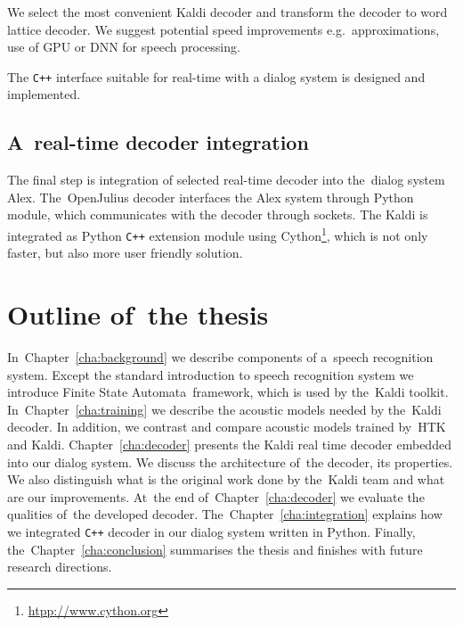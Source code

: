 We select the most convenient Kaldi decoder and 
transform the decoder to word lattice decoder. 
We suggest potential speed improvements e.g.\ approximations, use of \ac{GPU} 
or \ac{DNN} for speech processing\cite{vesely2013sequencediscriminative}.

The \verb!C++! interface suitable for real-time with a dialog system is designed and implemented.

\subsection{A~real-time decoder integration} 
\label{sub:integration}
The final step is integration of selected real-time decoder into the~dialog system Alex.
The~OpenJulius decoder interfaces the Alex system through Python module, 
which communicates with the decoder through sockets.
The Kaldi is integrated as Python \verb!C++! extension module 
using Cython\footnote{\url{htpp://www.cython.org}}, 
which is not only faster, but also more user friendly solution.


\section{Outline of~the thesis} 
\label{sec:outline_of_the_thesis}
In~Chapter~\ref{cha:background} we describe components of a~speech recognition system.  
Except the standard introduction to speech recognition system we introduce Finite State Automata~framework,
which is used by the~Kaldi toolkit. In~Chapter~\ref{cha:training} we describe the acoustic 
models needed by the~Kaldi decoder. 
In addition, we contrast and compare acoustic models trained by~\ac{HTK} and Kaldi. 
Chapter~\ref{cha:decoder} presents the Kaldi real time decoder embedded into our dialog system.
We discuss the architecture of~the decoder, its properties. We also distinguish what is the original work done by 
the~Kaldi team and what are our improvements. At~the end of~Chapter~\ref{cha:decoder} 
we evaluate the qualities of~the developed decoder.
The~Chapter~\ref{cha:integration} explains how we integrated \verb!C++! decoder in our dialog system written in Python.
Finally, the~Chapter~\ref{cha:conclusion} summarises the thesis and finishes with future research directions.

